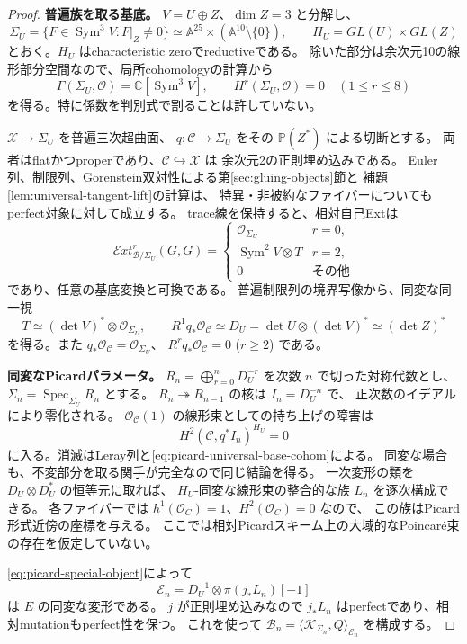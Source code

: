 \documentclass[a4paper,11pt]{ltjsarticle}
\theoremstyle{definition}
\newcommand{\CC}{\mathbb C}
\newcommand{\OO}{\mathcal O}
\newcommand{\PP}{\mathbb P}
\newcommand{\Aff}{\mathbb A}
\newcommand{\Sym}{\operatorname{Sym}}
\begin{document}
\begin{proof}
\textbf{普遍族を取る基底。}
$V=U\oplus Z$、$\dim Z=3$ と分解し、
\[
 \Sigma_U=\{F\in\Sym^3V:F|_Z\ne0\}
 \simeq\Aff^{25}\times(\Aff^{10}\setminus\{0\}),
 \qquad H_U=GL(U)\times GL(Z)
\]
とおく。$H_U$ はcharacteristic zeroでreductiveである。
除いた部分は余次元10の線形部分空間なので、局所cohomologyの計算から
\begin{equation}\label{eq:picard-universal-base-cohom}
 \Gamma(\Sigma_U,\OO)=\CC[\Sym^3V],\qquad
 H^r(\Sigma_U,\OO)=0\quad(1\le r\le8)
\end{equation}
を得る。特に係数を判別式で割ることは許していない。

$\mathcal X\to\Sigma_U$ を普遍三次超曲面、
$q:\mathcal C\to\Sigma_U$ をその $\PP(Z^*)$ による切断とする。
両者はflatかつproperであり、$\mathcal C\hookrightarrow\mathcal X$ は
余次元2の正則埋め込みである。
Euler列、制限列、Gorenstein双対性による第\ref{sec:gluing-objects}節と
補題\ref{lem:universal-tangent-lift}の計算は、
特異・非被約なファイバーについてもperfect対象に対して成立する。
trace線を保持すると、相対自己Extは
\[
 \mathcal E xt^r_{\mathcal B/\Sigma_U}(G,G)=
 \begin{cases}
  \OO_{\Sigma_U}&r=0,\\
  \Sym^2V\otimes T&r=2,\\
  0&\text{その他}
 \end{cases}
\]
であり、任意の基底変換と可換である。
普遍制限列の境界写像から、同変な同一視
\[
 T\simeq(\det V)^*\otimes\OO_{\Sigma_U},\qquad
 R^1q_*\OO_{\mathcal C}\simeq D_U
       =\det U\otimes(\det V)^*\simeq(\det Z)^*
\]
を得る。また $q_*\OO_{\mathcal C}=\OO_{\Sigma_U}$、
$R^rq_*\OO_{\mathcal C}=0$ ($r\ge2$) である。

\textbf{同変なPicardパラメータ。}
$R_n=\bigoplus_{r=0}^nD_U^{-r}$ を次数 $n$ で切った対称代数とし、
$\Sigma_n=\operatorname{Spec}_{\Sigma_U}R_n$ とする。
$R_n\twoheadrightarrow R_{n-1}$ の核は $I_n=D_U^{-n}$ で、
正次数のイデアルにより零化される。
$\OO_{\mathcal C}(1)$ の線形束としての持ち上げの障害は
\[
 H^2(\mathcal C,q^*I_n)^{H_U}=0
\]
に入る。消滅はLeray列と\eqref{eq:picard-universal-base-cohom}による。
同変な場合も、不変部分を取る関手が完全なので同じ結論を得る。
一次変形の類を $D_U\otimes D_U^*$ の恒等元に取れば、
$H_U$-同変な線形束の整合的な族 $L_n$ を逐次構成できる。
各ファイバーでは $h^1(\OO_C)=1$、$H^2(\OO_C)=0$ なので、
この族はPicard形式近傍の座標を与える。
ここでは相対Picardスキーム上の大域的なPoincar\'e束の存在を仮定していない。

\eqref{eq:picard-special-object}によって
\[
 \mathcal E_n=D_U^{-1}\otimes\pi(j_*L_n)[-1]
\]
は $E$ の同変な変形である。
$j$ が正則埋め込みなので $j_*L_n$ はperfectであり、相対mutationもperfect性を保つ。
これを使って $\mathcal B_n=\langle\mathcal K_{\Sigma_n},Q\rangle_{\mathcal E_n}$
を構成する。


\end{proof}
\end{document}
